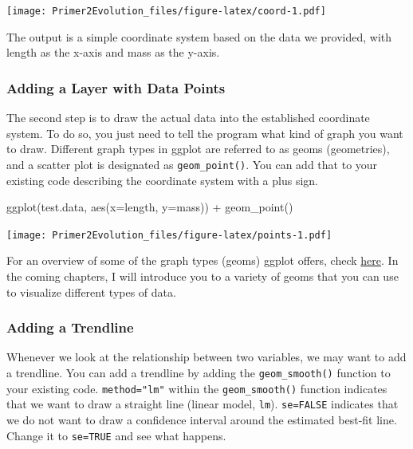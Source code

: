 \documentclass[
]{book}
\newenvironment{Shaded}{\begin{snugshade}}{\end{snugshade}}
\newcommand{\AttributeTok}[1]{\textcolor[rgb]{0.77,0.63,0.00}{#1}}
\newcommand{\FunctionTok}[1]{\textcolor[rgb]{0.00,0.00,0.00}{#1}}
\newcommand{\NormalTok}[1]{#1}
\newcommand{\SpecialCharTok}[1]{\textcolor[rgb]{0.00,0.00,0.00}{#1}}
\begin{document}
\texttt{[image: Primer2Evolution\_files/figure-latex/coord-1.pdf]}

The output is a simple coordinate system based on the data we provided, with length as the x-axis and mass as the y-axis.

\hypertarget{adding-a-layer-with-data-points}{%
\subsubsection*{Adding a Layer with Data Points}\label{adding-a-layer-with-data-points}}

The second step is to draw the actual data into the established coordinate system. To do so, you just need to tell the program what kind of graph you want to draw. Different graph types in ggplot are referred to as geoms (geometries), and a scatter plot is designated as \texttt{geom\_point()}. You can add that to your existing code describing the coordinate system with a plus sign.

\begin{Shaded}
\begin{Highlighting}[]
\FunctionTok{ggplot}\NormalTok{(test.data, }\FunctionTok{aes}\NormalTok{(}\AttributeTok{x=}\NormalTok{length, }\AttributeTok{y=}\NormalTok{mass)) }\SpecialCharTok{+}
  \FunctionTok{geom\_point}\NormalTok{()}
\end{Highlighting}
\end{Shaded}

\texttt{[image: Primer2Evolution\_files/figure-latex/points-1.pdf]}

For an overview of some of the graph types (geoms) ggplot offers, check \href{https://www.r-graph-gallery.com/}{here}. In the coming chapters, I will introduce you to a variety of geoms that you can use to visualize different types of data.

\hypertarget{adding-a-trendline}{%
\subsubsection*{Adding a Trendline}\label{adding-a-trendline}}

Whenever we look at the relationship between two variables, we may want to add a trendline. You can add a trendline by adding the \texttt{geom\_smooth()} function to your existing code. \texttt{method="lm"} within the \texttt{geom\_smooth()} function indicates that we want to draw a straight line (linear model, \texttt{lm}). \texttt{se=FALSE} indicates that we do not want to draw a confidence interval around the estimated best-fit line. Change it to \texttt{se=TRUE} and see what happens.
\end{document}
